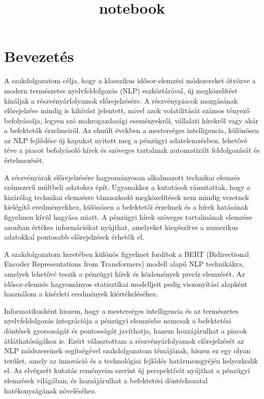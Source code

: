 \documentclass[11pt]{article}
\title{notebook}
\begin{document}
    
    \maketitle
    
    

    
    \section{Bevezetés}\label{bevezetuxe9s}

    A szakdolgozatom célja, hogy a klasszikus idősor-elemzési módszereket
ötvözve a modern természetes nyelvfeldolgozás (NLP) eszköztárával, új
megközelítést kínáljak a részvényárfolyamok előrejelzésére. A
részvénypiacok mozgásának előrejelzése mindig is kihívást jelentett,
mivel azok volatilitását számos tényező befolyásolja, legyen szó
makrogazdasági eseményekről, vállalati hírekről vagy akár a befektetők
érzelmeiről. Az elmúlt években a mesterséges intelligencia, különösen az
NLP fejlődése új kapukat nyitott meg a pénzügyi adatelemzésben, lehetővé
téve a piacot befolyásoló hírek és szöveges tartalmak automatizált
feldolgozását és értelmezését.

A részvényárak előrejelzésére hagyományosan alkalmazott technikai
elemzés számszerű múltbeli adatokra épít. Ugyanakkor a kutatások
rámutattak, hogy a kizárólag technikai elemzésre támaszkodó
megközelítések nem mindig vezetnek kielégítő eredményekhez, különösen a
befektetői érzelmek és a hírek hatásának figyelmen kívül hagyása miatt.
A pénzügyi hírek szöveges tartalmának elemzése azonban értékes
információkat nyújthat, amelyeket kiegészítve a numerikus adatokkal
pontosabb előrejelzések érhetők el.

A szakdolgozatom keretében különös figyelmet fordítok a BERT
(Bidirectional Encoder Representations from Transformers) modell alapú
NLP technikákra, amelyek lehetővé teszik a pénzügyi hírek és közlemények
precíz elemzését. Az idősor-elemzés hagyományos statisztikai modelljeit
pedig viszonyítási alapként használom a kísérleti eredmények
kiértékeléséhez.

Informatikusként hiszem, hogy a mesterséges intelligencia és az
természetes nyelvfeldolgozás integrációja a pénzügyi elemzésbe nemcsak a
befektetési döntések gyorsaságát és pontosságát javíthatja, hanem
hozzájárulhat a piacok átláthatóságához is. Ezért választottam a
részvényárfolyamok előrejelzését az NLP módszereinek segítségével
szakdolgozatom témájának, hiszen ez egy olyan terület, amely az
innováció és a technológiai fejlődés határmezsgyéjén helyezkedik el. Az
elvégzett kutatás reményeim szerint új perspektívát nyújthat a pénzügyi
elemzések világában, és hozzájárulhat a befektetési döntéshozatal
hatékonyságának növeléséhez.
\end{document}
